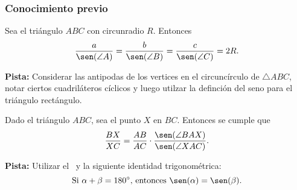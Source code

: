 \subsubsection{Conocimiento previo}

\begin{section-theorem.tcb}\label{law-of-sines}
    Sea el triángulo $ABC$ con circunradio $R$.
    Entonces
    \[
        \frac{a}{\sen(\angle A)} = \frac{b}{\sen(\angle B)} = \frac{c}{\sen(\angle C)} = 2R.
    \]
\end{section-theorem.tcb}

\textbf{Pista:} Considerar las antipodas de los vertices en el circuncírculo de $\triangle ABC$, notar ciertos cuadriláteros cíclicos y luego utilzar la definción del seno para el triángulo rectángulo.

\begin{section-theorem.tcb}\label{ratio-lemma}
    Dado el triángulo $ABC$, sea el punto $X$ en $BC$.
    Entonces se cumple que
    \[
        \frac{BX}{XC} = \frac{AB}{AC} \cdot \frac{\sen(\angle BAX)}{\sen(\angle XAC)}.
    \]
\end{section-theorem.tcb}

\textbf{Pista:} Utilizar el~ y la siguiente identidad trigonométrica:
\[
    \text{Si}\ \alpha + \beta = 180^\circ\text{,}\ \text{entonces}\ \sen(\alpha) = \sen(\beta).
\]